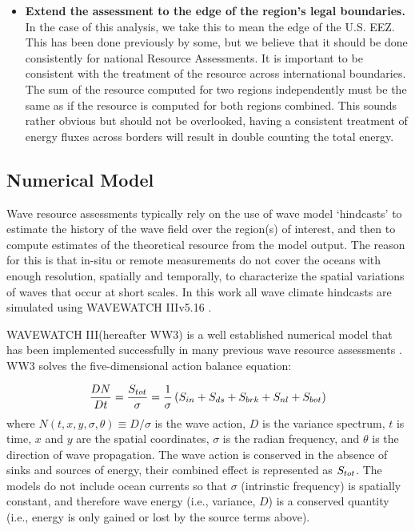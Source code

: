 \begin{itemize}
\begin{itemize}
\end{itemize}
\item {\bf Extend the assessment to the edge of the region's legal boundaries.} In the case of this analysis, we take this to mean the edge of the U.S. EEZ. This has been done previously by some, but we believe that it should be done consistently for national Resource Assessments. It is important to be consistent with the treatment of the resource across international boundaries. The sum of the resource computed for two regions independently must be the same as if the resource is computed for both regions combined. This sounds rather obvious but should not be overlooked, having a consistent treatment of energy fluxes across borders will result in double counting the total energy.
\end{itemize}


\subsection{Numerical Model} \label{sec:method:model}

Wave resource assessments typically rely on the use of wave model `hindcasts' to estimate the history of the wave field over the region(s) of interest, and then to compute estimates of the theoretical resource from the model output. The reason for this is that in-situ or remote measurements do not cover the oceans with enough resolution, spatially and temporally, to characterize the spatial variations of waves that occur at short scales. 
In this work all wave climate hindcasts are simulated using WAVEWATCH III\textregistered v5.16 \citep{tolmanDistributedmemoryConceptsWave2002,tolmanwavewatch}.

WAVEWATCH III\textregistered (hereafter WW3) is a  well established numerical model that has been implemented successfully in many previous wave resource assessments \citep[e.g.,][]{garcia-medinaWaveResourceAssessment2014,hemerRevisedAssessmentAustralia2017,yangWaveModelTest2017}.
WW3 solves the five-dimensional action balance equation:

\begin{align}
  \frac{DN}{Dt} = \frac{S_{ tot }}{\sigma} = \frac{1}{\sigma}\left ( S_{ in } + S_{ ds } + S_{ brk } + S_{ nl } + S_{ bot } \right )
\end{align}
where $N(t,x,y,\sigma,\theta) \equiv D/\sigma$ is the wave action, $D$ is the variance spectrum, $t$ is time, $x$ and $y$ are the spatial coordinates, $\sigma$ is the radian frequency, and $\theta$ is the direction of wave propagation.
The wave action is conserved in the absence of sinks and sources of energy, their combined effect is represented as $S_{ tot }$.
The models do not include ocean currents so that $\sigma$ (intrinstic frequency) is spatially constant, and therefore wave energy (i.e., variance, $D$) is a conserved quantity (i.e., energy is only gained or lost by the source terms above).

